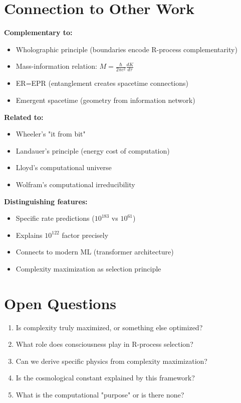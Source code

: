 ﻿\documentclass{article}
\begin{document}
\section{Connection to Other Work}


\textbf{Complementary to:}
\begin{itemize}
\item Wholographic principle (boundaries encode R-process complementarity)
\item Mass-information relation: $M = \frac{\hbar}{2\pi c^2}\frac{dK}{d\tau}$
\item ER=EPR (entanglement creates spacetime connections)
\item Emergent spacetime (geometry from information network)
\end{itemize}


\textbf{Related to:}
\begin{itemize}
\item Wheeler's "it from bit"
\item Landauer's principle (energy cost of computation)
\item Lloyd's computational universe
\item Wolfram's computational irreducibility
\end{itemize}


\textbf{Distinguishing features:}
\begin{itemize}
\item Specific rate predictions ($10^{183}$ vs $10^{61}$)
\item Explains $10^{122}$ factor precisely
\item Connects to modern ML (transformer architecture)
\item Complexity maximization as selection principle
\end{itemize}


\section{Open Questions}


\begin{enumerate}
\item Is complexity truly maximized, or something else optimized?
\item What role does consciousness play in R-process selection?
\item Can we derive specific physics from complexity maximization?
\item Is the cosmological constant explained by this framework?
\item What is the computational "purpose" or is there none?
\end{enumerate}
\end{document}
